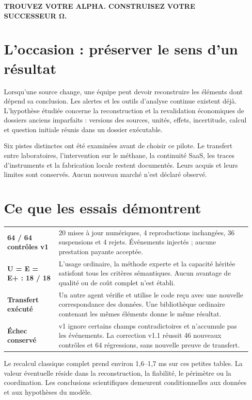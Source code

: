 \documentclass[10pt]{article}
\begin{document}
{\sffamily\bfseries\color{teal}TROUVEZ VOTRE ALPHA. CONSTRUISEZ VOTRE SUCCESSEUR Ω.}

\section*{L'occasion : préserver le sens d'un résultat}

Lorsqu'une source change, une équipe peut devoir reconstruire les éléments dont dépend sa conclusion. Les alertes et les outils d'analyse continue existent déjà. L'hypothèse étudiée concerne la reconstruction et la revalidation économiques de dossiers anciens imparfaits : versions des sources, unités, effets, incertitude, calcul et question initiale réunis dans un dossier exécutable.

Six pistes distinctes ont été examinées avant de choisir ce pilote. Le transfert entre laboratoires, l'intervention sur le méthane, la continuité SaaS, les traces d'instruments et la fabrication locale restent documentés. Leurs acquis et leurs limites sont conservés. Aucun nouveau marché n'est déclaré observé.

\section*{Ce que les essais démontrent}

\begin{tabularx}{\textwidth}{p{}Y}
\toprule
\textbf{64 / 64 contrôles v1} &20 mises à jour numériques, 4 reproductions inchangées, 36 suspensions et 4 rejets. Événements injectés ; aucune prestation payante acceptée.\\
\textbf{U = E = E+ : 18 / 18} &L'usage ordinaire, la méthode experte et la capacité héritée satisfont tous les critères sémantiques. Aucun avantage de qualité ou de coût complet n'est établi.\\
\textbf{Transfert exécuté} &Un autre agent vérifie et utilise le code reçu avec une nouvelle correspondance des données. Une bibliothèque ordinaire contenant les mêmes éléments donne le même résultat.\\
\textbf{Échec conservé} &v1 ignore certains champs contradictoires et n'accumule pas les événements. La correction v1.1 réussit 46 nouveaux contrôles et 64 régressions, sans nouvelle preuve de transfert.\\
\bottomrule
\end{tabularx}

Le recalcul classique complet prend environ 1,6–1,7 ms sur ces petites tables. La valeur éventuelle réside dans la reconstruction, la fiabilité, le périmètre ou la coordination. Les conclusions scientifiques demeurent conditionnelles aux données et aux hypothèses du modèle.
\end{document}
